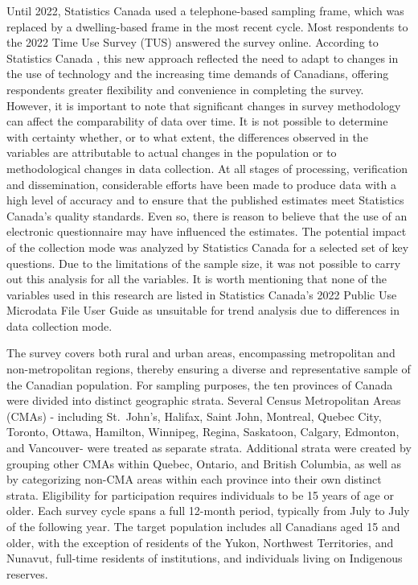 \documentclass[preprint, 3p,
authoryear]{elsarticle} %
\begin{document}
Until 2022, Statistics Canada used a telephone-based sampling frame,
which was replaced by a dwelling-based frame in the most recent cycle.
Most respondents to the 2022 Time Use Survey (TUS) answered the survey
online. According to Statistics Canada
\citeyearpar{statisticscanada2022}, this new approach reflected the need
to adapt to changes in the use of technology and the increasing time
demands of Canadians, offering respondents greater flexibility and
convenience in completing the survey. However, it is important to note
that significant changes in survey methodology can affect the
comparability of data over time. It is not possible to determine with
certainty whether, or to what extent, the differences observed in the
variables are attributable to actual changes in the population or to
methodological changes in data collection. At all stages of processing,
verification and dissemination, considerable efforts have been made to
produce data with a high level of accuracy and to ensure that the
published estimates meet Statistics Canada's quality standards. Even so,
there is reason to believe that the use of an electronic questionnaire
may have influenced the estimates. The potential impact of the
collection mode was analyzed by Statistics Canada for a selected set of
key questions. Due to the limitations of the sample size, it was not
possible to carry out this analysis for all the variables. It is worth
mentioning that none of the variables used in this research are listed
in Statistics Canada's 2022 Public Use Microdata File User Guide
\citep{statisticscanada2022} as unsuitable for trend analysis due to
differences in data collection mode.

The survey covers both rural and urban areas, encompassing metropolitan
and non-metropolitan regions, thereby ensuring a diverse and
representative sample of the Canadian population. For sampling purposes,
the ten provinces of Canada were divided into distinct geographic
strata. Several Census Metropolitan Areas (CMAs) - including St.~John's,
Halifax, Saint John, Montreal, Quebec City, Toronto, Ottawa, Hamilton,
Winnipeg, Regina, Saskatoon, Calgary, Edmonton, and Vancouver- were
treated as separate strata. Additional strata were created by grouping
other CMAs within Quebec, Ontario, and British Columbia, as well as by
categorizing non-CMA areas within each province into their own distinct
strata. Eligibility for participation requires individuals to be 15
years of age or older. Each survey cycle spans a full 12-month period,
typically from July to July of the following year. The target population
includes all Canadians aged 15 and older, with the exception of
residents of the Yukon, Northwest Territories, and Nunavut, full-time
residents of institutions, and individuals living on Indigenous
reserves.
\end{document}
